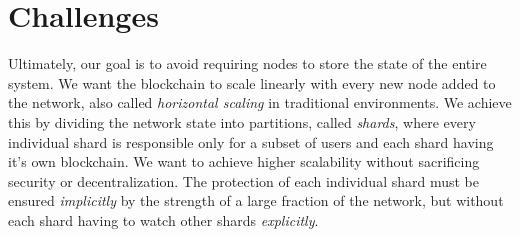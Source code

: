 \section{Challenges}

\label{Chapter:Background:Challenges}

Ultimately, our goal is to avoid requiring nodes to store the state of the entire system. We want the blockchain to scale linearly with every new node added to the network, also called \textit{horizontal scaling} in traditional environments. We achieve this by dividing the network state into partitions, called \textit{shards}, where every individual shard is responsible only for a subset of users and each shard having it's own blockchain. We want to achieve higher scalability without sacrificing security or decentralization. The protection of each individual shard must be ensured \textit{implicitly} by the strength of a large fraction of the network, but without each shard having to watch other shards \textit{explicitly}.

